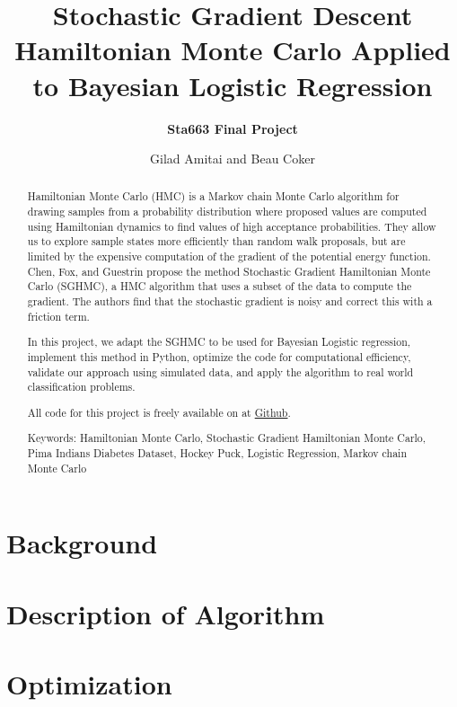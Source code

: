 \documentclass[12pt]{article}
\begin{document}
\vspace{-1in}
\author{\bf Sta663 Final Project}
\title{\bf Stochastic Gradient Descent Hamiltonian Monte Carlo Applied to Bayesian Logistic Regression}
\date{Gilad Amitai and Beau Coker}
\maketitle 


\begin{abstract}
	Hamiltonian Monte Carlo (HMC) is a Markov chain Monte Carlo algorithm for drawing samples from a probability distribution where proposed values are computed using Hamiltonian dynamics to find values of high acceptance probabilities. They allow us to explore sample states more efficiently than random walk proposals, but are limited by the expensive computation of the gradient of the potential energy function. Chen, Fox, and Guestrin propose the method Stochastic Gradient Hamiltonian Monte Carlo (SGHMC), a HMC algorithm that uses a subset of the data to compute the gradient. The authors find that the stochastic gradient is noisy and correct this with a friction term.

	In this project, we adapt the SGHMC to be used for Bayesian Logistic regression, implement this method in Python, optimize the code for computational efficiency, validate our approach using simulated data, and apply the algorithm to real world classification problems.
	
	All code for this project is freely available on  at \href{https://github.com/gldmt-duke/CokerAmitaiSGHMC}{Github}.
	
	Keywords: Hamiltonian Monte Carlo, Stochastic Gradient Hamiltonian Monte Carlo, Pima Indians Diabetes Dataset, Hockey Puck, Logistic Regression, Markov chain Monte Carlo
\end{abstract}

\section{Background}


\section{Description of Algorithm}


\section{Optimization}

\end{document}
